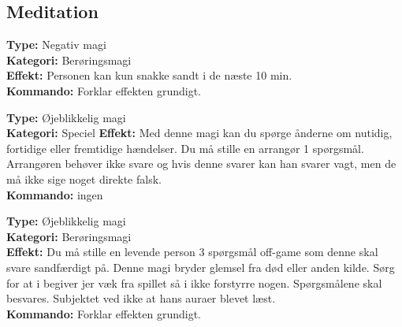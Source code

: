 \subsection*{Meditation}
\begin{meditation*}[Sandhed]
\textbf{Type:} Negativ magi\\
\textbf{Kategori:} Berøringsmagi\\
\textbf{Effekt:} Personen kan kun snakke sandt i de næste 10 min.\\
\textbf{Kommando:} Forklar effekten grundigt.
\end{meditation*}

\begin{meditation*}
\textbf{Type:} Øjeblikkelig magi\\
\textbf{Kategori:} Speciel
\textbf{Effekt:} Med denne magi kan du spørge ånderne om nutidig, fortidige eller fremtidige hændelser. Du må stille en arrangør 1 spørgsmål. Arrangøren behøver ikke svare og hvis denne svarer kan han svarer vagt, men de må ikke sige noget direkte falsk.\\
\textbf{Kommando:} ingen
\end{meditation*}

\begin{meditation*}
\textbf{Type:} Øjeblikkelig magi\\
\textbf{Kategori:} Berøringsmagi\\
\textbf{Effekt:} Du må stille en levende person 3 spørgsmål off-game som denne skal svare sandfærdigt på. Denne magi bryder glemsel fra død eller anden kilde. Sørg for at i begiver jer væk fra spillet så i ikke forstyrre nogen. Spørgsmålene skal besvares. Subjektet ved ikke at hans auraer blevet læst.\\
\textbf{Kommando:} Forklar effekten grundigt.
\end{meditation*}


